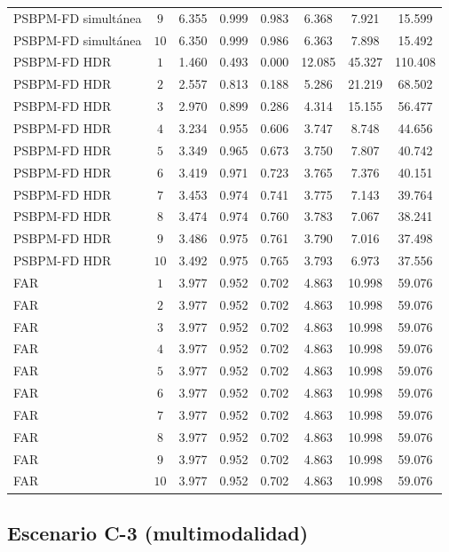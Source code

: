 \begin{table}[H]
\begin{tabular}{l c cccccc}
PSBPM-FD simultánea & $9$ & 6.355 & 0.999 & 0.983 & 6.368 & 7.921 & 15.599 \\
PSBPM-FD simultánea & $10$ & 6.350 & 0.999 & 0.986 & 6.363 & 7.898 & 15.492 \\
\hline
PSBPM-FD HDR & $1$ & 1.460 & 0.493 & 0.000 & 12.085 & 45.327 & 110.408 \\
PSBPM-FD HDR & $2$ & 2.557 & 0.813 & 0.188 & 5.286 & 21.219 & 68.502 \\
PSBPM-FD HDR & $3$ & 2.970 & 0.899 & 0.286 & 4.314 & 15.155 & 56.477 \\
PSBPM-FD HDR & $4$ & 3.234 & 0.955 & 0.606 & 3.747 & 8.748 & 44.656 \\
PSBPM-FD HDR & $5$ & 3.349 & 0.965 & 0.673 & 3.750 & 7.807 & 40.742 \\
PSBPM-FD HDR & $6$ & 3.419 & 0.971 & 0.723 & 3.765 & 7.376 & 40.151 \\
PSBPM-FD HDR & $7$ & 3.453 & 0.974 & 0.741 & 3.775 & 7.143 & 39.764 \\
PSBPM-FD HDR & $8$ & 3.474 & 0.974 & 0.760 & 3.783 & 7.067 & 38.241 \\
PSBPM-FD HDR & $9$ & 3.486 & 0.975 & 0.761 & 3.790 & 7.016 & 37.498 \\
PSBPM-FD HDR & $10$ & 3.492 & 0.975 & 0.765 & 3.793 & 6.973 & 37.556 \\
\hline
FAR & $1$ & 3.977 & 0.952 & 0.702 & 4.863 & 10.998 & 59.076 \\
FAR & $2$ & 3.977 & 0.952 & 0.702 & 4.863 & 10.998 & 59.076 \\
FAR & $3$ & 3.977 & 0.952 & 0.702 & 4.863 & 10.998 & 59.076 \\
FAR & $4$ & 3.977 & 0.952 & 0.702 & 4.863 & 10.998 & 59.076 \\
FAR & $5$ & 3.977 & 0.952 & 0.702 & 4.863 & 10.998 & 59.076 \\
FAR & $6$ & 3.977 & 0.952 & 0.702 & 4.863 & 10.998 & 59.076 \\
FAR & $7$ & 3.977 & 0.952 & 0.702 & 4.863 & 10.998 & 59.076 \\
FAR & $8$ & 3.977 & 0.952 & 0.702 & 4.863 & 10.998 & 59.076 \\
FAR & $9$ & 3.977 & 0.952 & 0.702 & 4.863 & 10.998 & 59.076 \\
FAR & $10$ & 3.977 & 0.952 & 0.702 & 4.863 & 10.998 & 59.076 \\
\hline
\end{tabular}
\end{table}

\subsection{Escenario C-3 (multimodalidad)}
\label{aneB_00_01_03_metricas_multimodal}

